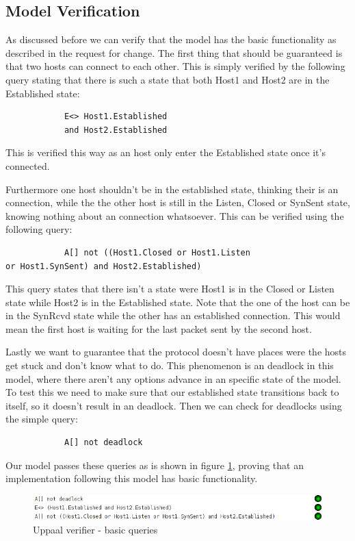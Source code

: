 \documentclass[twocolumn]{article}
\begin{document}
	\subsection{Model Verification} %
	\label{sub:model_verification}
		As discussed before we can verify that the model has the basic functionality as described in the request for change. The first thing that should be guaranteed is that two hosts can connect to each other. This is simply verified by the following query stating that there is such a state that both Host1 and Host2 are in the Established state:
		\begin{verbatim}
			E<> Host1.Established 
			and Host2.Established
		\end{verbatim}
		This is verified this way as an host only enter the Established state once it's connected.

		Furthermore one host shouldn't be in the established state, thinking their is an connection, while the the other host is still in the Listen, Closed or SynSent state, knowing nothing about an connection whatsoever. This can be verified using the following query:
		\begin{verbatim}
			A[] not ((Host1.Closed or Host1.Listen 
or Host1.SynSent) and Host2.Established)
		\end{verbatim}
		This query states that there isn't a state were Host1 is in the Closed or Listen state while Host2 is in the Established state. Note that the one of the host can be in the SynRcvd state while the other has an established connection. This would mean the first host is waiting for the last packet sent by the second host.

		Lastly we want to guarantee that the protocol doesn't have places were the hosts get stuck and don't know what to do. This phenomenon is an deadlock in this model, where there aren't any options advance in an specific state of the model. To test this we need to make sure that our established state transitions back to itself, so it doesn't result in an deadlock. Then we can check for deadlocks using the simple query:
		\begin{verbatim}
			A[] not deadlock
		\end{verbatim}

		Our model passes these queries as is shown in figure \ref{fig:verifier}, proving that an implementation following this model has basic functionality.
		\begin{figure}[h!]
			\begin{center}
				\includegraphics[width=\linewidth]{verifier.png}
			\end{center}
			\caption{Uppaal verifier - basic queries}
			\label{fig:verifier}
		\end{figure}
\end{document}
